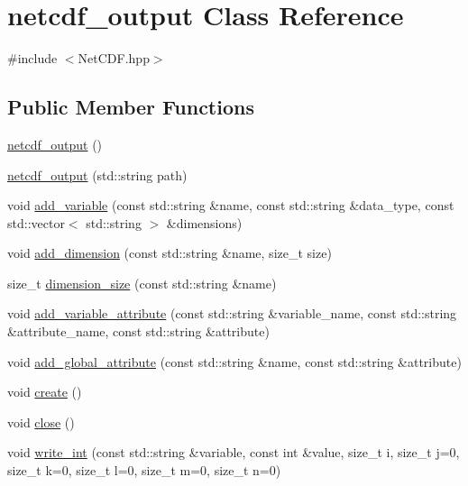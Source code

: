 \hypertarget{classnetcdf__output}{\section{netcdf\-\_\-output Class Reference}
\label{classnetcdf__output}
}


{\ttfamily \#include $<$Net\-C\-D\-F.\-hpp$>$}

\subsection*{Public Member Functions}
\begin{DoxyCompactItemize}
\item 
\hyperlink{classnetcdf__output_a607beec4937440be21f6a647b77385a0}{netcdf\-\_\-output} ()
\item 
\hyperlink{classnetcdf__output_af4474f9a65efa2795955412812a238fa}{netcdf\-\_\-output} (std\-::string path)
\item 
void \hyperlink{classnetcdf__output_a3216000bd093a7e80e784f93d625b9ef}{add\-\_\-variable} (const std\-::string \&name, const std\-::string \&data\-\_\-type, const std\-::vector$<$ std\-::string $>$ \&dimensions)
\item 
void \hyperlink{classnetcdf__output_abb18e538b6f4eb054efd58f76dd30bc1}{add\-\_\-dimension} (const std\-::string \&name, size\-\_\-t size)
\item 
size\-\_\-t \hyperlink{classnetcdf__output_a5323ef8e498baffcaade0e676cd7b794}{dimension\-\_\-size} (const std\-::string \&name)
\item 
void \hyperlink{classnetcdf__output_ad251a62975375a0be02db1a2b458d014}{add\-\_\-variable\-\_\-attribute} (const std\-::string \&variable\-\_\-name, const std\-::string \&attribute\-\_\-name, const std\-::string \&attribute)
\item 
void \hyperlink{classnetcdf__output_a6d23e007661a7e5704b77ade20bcd813}{add\-\_\-global\-\_\-attribute} (const std\-::string \&name, const std\-::string \&attribute)
\item 
void \hyperlink{classnetcdf__output_acd3ab83c891f21e15e84c4647ab53b63}{create} ()
\item 
void \hyperlink{classnetcdf__output_a76dbce9c73302b9671bc58bdc5c04241}{close} ()
\item 
void \hyperlink{classnetcdf__output_a083d5357edb0148e5279e178252b6fb0}{write\-\_\-int} (const std\-::string \&variable, const int \&value, size\-\_\-t i, size\-\_\-t j=0, size\-\_\-t k=0, size\-\_\-t l=0, size\-\_\-t m=0, size\-\_\-t n=0)

\end{DoxyCompactItemize}
